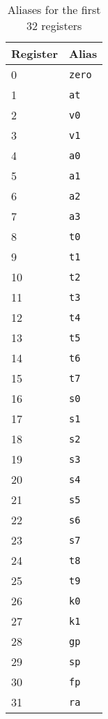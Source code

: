 \documentclass[12pt]{report}
\begin{document}
\begin{table}[!htb]
	\begin{centering}
		\begin{tabular}{ll}
			\hline
			\hline
			Register & Alias\\
			\hline
			0 & \texttt{zero}\\
			1 & \texttt{at}\\
			2 & \texttt{v0}\\
			3 & \texttt{v1}\\
			4 & \texttt{a0}\\
			5 & \texttt{a1}\\
			6 & \texttt{a2}\\
			7 & \texttt{a3}\\
			8 & \texttt{t0}\\
			9 & \texttt{t1}\\
			10 & \texttt{t2}\\
			11 & \texttt{t3}\\
			12 & \texttt{t4}\\
			13 & \texttt{t5}\\
			14 & \texttt{t6}\\
			15 & \texttt{t7}\\
			16 & \texttt{s0}\\
			17 & \texttt{s1}\\
			18 & \texttt{s2}\\
			19 & \texttt{s3}\\
			20 & \texttt{s4}\\
			21 & \texttt{s5}\\
			22 & \texttt{s6}\\
			23 & \texttt{s7}\\
			24 & \texttt{t8}\\
			25 & \texttt{t9}\\
			26 & \texttt{k0}\\
			27 & \texttt{k1}\\
			28 & \texttt{gp}\\
			29 & \texttt{sp}\\
			30 & \texttt{fp}\\
			31 & \texttt{ra}\\
		\end{tabular}
		\caption{Aliases for the first 32 registers}
		\label{table:mips32-reg}
	\end{centering}
\end{table}

\end{document}
